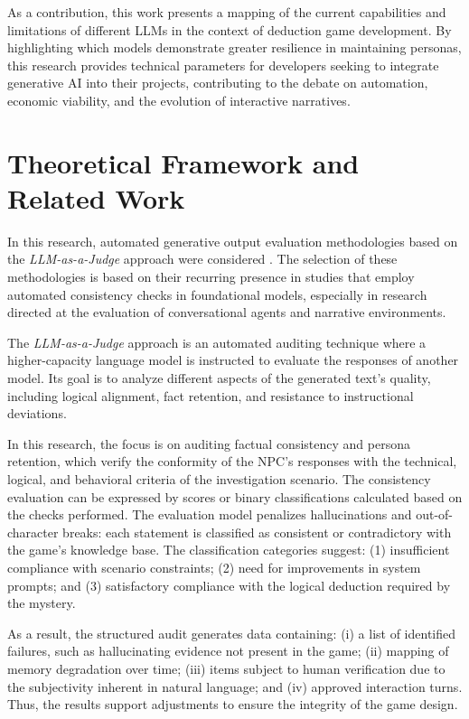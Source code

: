 \documentclass[12pt]{article}
\begin{document}
As a contribution, this work presents a mapping of the current capabilities and limitations of different LLMs in the context of deduction game development. By highlighting which models demonstrate greater resilience in maintaining personas, this research provides technical parameters for developers seeking to integrate generative AI into their projects, contributing to the debate on automation, economic viability, and the evolution of interactive narratives.

\section{Theoretical Framework and Related Work} 
\label{sec:referenciaTeorico}

In this research, automated generative output evaluation methodologies based on the \textit{LLM-as-a-Judge} approach were considered \cite{zheng2023judging}. The selection of these methodologies is based on their recurring presence in studies that employ automated consistency checks in foundational models, especially in research directed at the evaluation of conversational agents and narrative environments.

The \textit{LLM-as-a-Judge} approach \cite{zheng2023judging} is an automated auditing technique where a higher-capacity language model is instructed to evaluate the responses of another model. Its goal is to analyze different aspects of the generated text's quality, including logical alignment, fact retention, and resistance to instructional deviations.

In this research, the focus is on auditing factual consistency and persona retention, which verify the conformity of the NPC's responses with the technical, logical, and behavioral criteria of the investigation scenario. The consistency evaluation can be expressed by scores or binary classifications calculated based on the checks performed. The evaluation model penalizes hallucinations and out-of-character breaks: each statement is classified as consistent or contradictory with the game's knowledge base. The classification categories suggest: (1) insufficient compliance with scenario constraints; (2) need for improvements in system prompts; and (3) satisfactory compliance with the logical deduction required by the mystery.

As a result, the structured audit generates data containing: (i) a list of identified failures, such as hallucinating evidence not present in the game; (ii) mapping of memory degradation over time; (iii) items subject to human verification due to the subjectivity inherent in natural language; and (iv) approved interaction turns. Thus, the results support adjustments to ensure the integrity of the game design.
\end{document}

